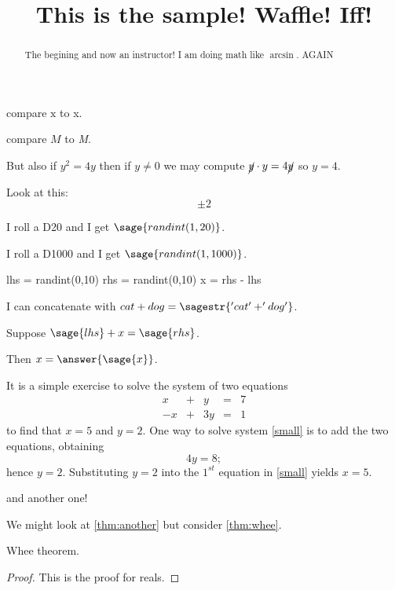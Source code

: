 \documentclass{ximera}
\title[Breal-grond]{This is the sample! Waffle!  Iff!}
\makeatletter
\newcommand{\makerandom}{}
\newcommand{\makerandom}{%
  \ST@wsf{jobname="\currfilebase"}%
  \ST@wsf{import hashlib}%
  \ST@wsf{set_random_seed(int(hashlib.sha256(jobname.encode('utf-8')).hexdigest(), 16))}%
}
\makeatother
\begin{document}
\begin{abstract}
  The begining and now an instructor! I am doing math like $\arcsin$. AGAIN
\end{abstract}

\maketitle
\makerandom

compare $\mathrm{x}$ to x.

compare $M$ to \textit{M}.

But also if $y^2 = 4y$ then if $y \neq 0$ we may compute $\cancel{y} \cdot y = 4 \cancel{y}$ so $y = 4$.

Look at this:
\[
  \pm 2
\]

I roll a D20 and I get $\sage{randint(1,20)}$.

I roll a D1000 and I get $\sage{randint(1,1000)}$.


\begin{sagesilent}
  lhs = randint(0,10)
  rhs = randint(0,10)
  x = rhs - lhs
\end{sagesilent}

I can concatenate with $cat + dog = \sagestr{'cat' + 'dog'}$.

\begin{problem}
  Suppose $\sage{lhs} + x = \sage{rhs}$.

  Then $x = \answer{\sage{x}}$.
\end{problem}

It is a simple exercise to solve the system of two equations
\begin{equation} \label{small}
\begin{array}{rcrcr}
 x & + & y & = & 7 \\
-x & + & 3y & = & 1
\end{array}
\end{equation}
to find that $x=5$ and $y=2$.  One way to solve
system \eqref{small} is to add the two equations, obtaining
\[
4y=8;
\]
hence $y=2$.  Substituting $y=2$ into the $1^{st}$ equation in
\ref{small} yields $x=5$.





and another one!



We might look at \ref{thm:another} but consider \ref{thm:whee}.

\begin{theorem}
  \label{thm:whee}  Whee theorem.
\end{theorem}
\begin{proof}
This is the proof for reals.
\end{proof}
\end{document}
